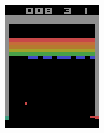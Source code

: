\begin{figure}
\begin{subfigure}[h]{0.19\linewidth}
\includegraphics[width=\linewidth]{images/frame-sequence-2.png}
\end{subfigure}
\hfill
\begin{subfigure}[h]{0.19\linewidth}

\end{subfigure}
\end{figure}
